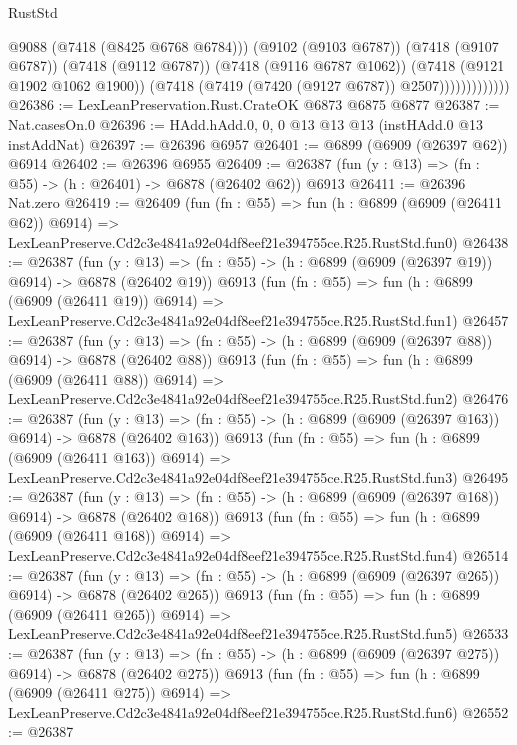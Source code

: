 \begin{lexlean}{RustStd}
\begin{coremodule}
                            @9088
                            (@7418 (@8425 @6768 @6784)))
                          (@9102 (@9103 @6787))
                          (@7418 (@9107 @6787))
                          (@7418 (@9112 @6787))
                          (@7418 (@9116 @6787 @1062))
                          (@7418 (@9121 @1902 @1062 @1900))
                          (@7418 (@7419 (@7420 (@9127 @6787)) @2507)))))))))))))
@26386 := LexLeanPreservation.Rust.CrateOK @6873 @6875 @6877
@26387 := Nat.casesOn.{0}
@26396 := HAdd.hAdd.{0, 0, 0} @13 @13 @13 (instHAdd.{0} @13 instAddNat)
@26397 := @26396 @6957
@26401 := @6899 (@6909 (@26397 @62)) @6914
@26402 := @26396 @6955
@26409 := @26387 (fun (y : @13) => (fn : @55) -> (h : @26401) -> @6878 (@26402 @62)) @6913
@26411 := @26396 Nat.zero
@26419 := @26409
    (fun (fn : @55) =>
    fun (h : @6899 (@6909 (@26411 @62)) @6914) =>
    LexLeanPreserve.Cd2c3e4841a92e04df8eef21e394755ce.R25.RustStd.fun0)
@26438 := @26387
    (fun (y : @13) => (fn : @55) -> (h : @6899 (@6909 (@26397 @19)) @6914) -> @6878 (@26402 @19))
    @6913
    (fun (fn : @55) =>
    fun (h : @6899 (@6909 (@26411 @19)) @6914) =>
    LexLeanPreserve.Cd2c3e4841a92e04df8eef21e394755ce.R25.RustStd.fun1)
@26457 := @26387
    (fun (y : @13) => (fn : @55) -> (h : @6899 (@6909 (@26397 @88)) @6914) -> @6878 (@26402 @88))
    @6913
    (fun (fn : @55) =>
    fun (h : @6899 (@6909 (@26411 @88)) @6914) =>
    LexLeanPreserve.Cd2c3e4841a92e04df8eef21e394755ce.R25.RustStd.fun2)
@26476 := @26387
    (fun (y : @13) => (fn : @55) -> (h : @6899 (@6909 (@26397 @163)) @6914) -> @6878 (@26402 @163))
    @6913
    (fun (fn : @55) =>
    fun (h : @6899 (@6909 (@26411 @163)) @6914) =>
    LexLeanPreserve.Cd2c3e4841a92e04df8eef21e394755ce.R25.RustStd.fun3)
@26495 := @26387
    (fun (y : @13) => (fn : @55) -> (h : @6899 (@6909 (@26397 @168)) @6914) -> @6878 (@26402 @168))
    @6913
    (fun (fn : @55) =>
    fun (h : @6899 (@6909 (@26411 @168)) @6914) =>
    LexLeanPreserve.Cd2c3e4841a92e04df8eef21e394755ce.R25.RustStd.fun4)
@26514 := @26387
    (fun (y : @13) => (fn : @55) -> (h : @6899 (@6909 (@26397 @265)) @6914) -> @6878 (@26402 @265))
    @6913
    (fun (fn : @55) =>
    fun (h : @6899 (@6909 (@26411 @265)) @6914) =>
    LexLeanPreserve.Cd2c3e4841a92e04df8eef21e394755ce.R25.RustStd.fun5)
@26533 := @26387
    (fun (y : @13) => (fn : @55) -> (h : @6899 (@6909 (@26397 @275)) @6914) -> @6878 (@26402 @275))
    @6913
    (fun (fn : @55) =>
    fun (h : @6899 (@6909 (@26411 @275)) @6914) =>
    LexLeanPreserve.Cd2c3e4841a92e04df8eef21e394755ce.R25.RustStd.fun6)
@26552 := @26387

\end{coremodule}
\end{lexlean}

